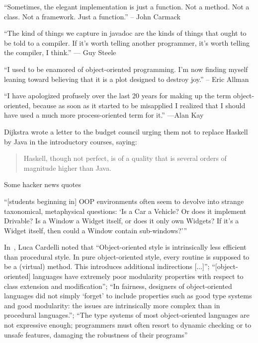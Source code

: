 \documentclass{article}
\begin{document}

\enquote{Sometimes, the elegant implementation is just a function. Not a
method. Not a class. Not a framework. Just a function.}
– John Carmack

\enquote{The kind of things we capture in javadoc are the kinds of things
that ought to be told to a compiler. If it's worth telling another
programmer, it's worth telling the compiler, I think.}
--- Guy Steele\cite{Sei09}

\enquote{I used to be enamored of object-oriented programming. I’m now
finding myself leaning toward believing that it is a plot designed to destroy
joy.}
– Eric Allman

\enquote{I have apologized profusely over the last 20 years for making up the
term object-oriented, because as soon as it started to be misapplied I
realized that I should have used a much more process-oriented term for it.}
---Alan Kay\cite{Kay97}

Dijkstra wrote a letter to the budget council urging them not to replace
Haskell by Java in the introductory courses, saying: \blockquote{Haskell,
though not perfect, is of a quality that is several orders of magnitude
higher than Java.}\cite{Dij01}

Some hacker news quotes

\enquote{[students beginning in] OOP environments often seem to devolve into
strange taxonomical, metaphysical questions: \enquote{Is a Car a Vehicle? Or
does it implement Drivable? Is a Window a Widget itself, or does it only own
Widgets? If it's a Widget itself, then could a Window contain sub-windows?}}


In~\cite{Car96}, Luca Cardelli noted that \enquote{Object-oriented style is
intrinsically less efficient than procedural style. In pure object-oriented
style, every routine is supposed to be a (virtual) method. This introduces
additional indirections [\(\dots\)]}; \enquote{[object-oriented] languages
have extremely poor modularity properties with respect to class extension and
modification}; \enquote{In fairness, designers of object-oriented languages
did not simply \enquote{forget} to include properties such as good type
systems and good modularity: the issues are intrinsically more complex than
in procedural languages.}; \enquote{The type systems of most object-oriented languages are not
expressive enough; programmers must often resort to dynamic checking or to
unsafe features, damaging the robustness of their programs}
\end{document}
